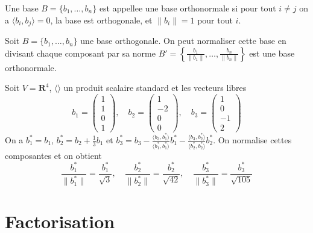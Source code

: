 \begin{definition}
Une base $B=\{ b_{1},\dots,b_{n} \}$ est appellee une base orthonormale si pour tout $i\neq j$ on a $\langle b_{i},b_{j} \rangle=0$, la base est orthogonale, et $\lVert b_{i} \rVert=1$ pour tout $i$.
\end{definition}
\begin{remark}
Soit $B=\{ b_{1},\dots,b_{n} \}$ une base orthogonale. On peut normaliser cette base en divisant chaque composant par sa norme $B'=\left\{  \frac{b_{1}}{\lVert b_{1} \rVert},\dots, \frac{b_{n}}{\lVert b_{n} \rVert}  \right\}$ est une base orthonormale.
\end{remark}
\begin{example}
Soit $V=\mathbf{R}^{4}$, $\langle  \rangle$ un produit scalaire standard et les vecteurs libres
$$
b_{1}=\begin{pmatrix}
1 \\
1 \\
0 \\
1
\end{pmatrix},\quad b_{2}=\begin{pmatrix}
1 \\
-2 \\
0 \\
0
\end{pmatrix}, \quad b_{3}=\begin{pmatrix}
1 \\
0 \\
-1 \\
2
\end{pmatrix}
$$
On a $b_{1}^{*}=b_{1}$, $b_{2}^{*}=b_{2}+\frac{1}{3}b_{1}$ et $b_{3}^{*}=b_{3}-\frac{\langle b_{3},b_{1}^{*} \rangle}{\langle b_{1}^{*},b_{1}^{*} \rangle}b_{1}^{*}-\frac{\langle b_{3},b_{2}^{*} \rangle}{\langle b_{2}^{*},b_{2}^{*} \rangle}b_{2}^{*}$. On normalise cettes composantes et on obtient
$$
\frac{b_{1}^{*}}{\lVert b_{1}^{*} \rVert }=\frac{b_{1}^{*}}{\sqrt{ 3 }},\quad \frac{b_{2}^{*}}{\lVert b_{2}^{*} \rVert }=\frac{b_{2}^{*}}{\sqrt{ 42 }},\quad \frac{b_{3}^{*}}{\lVert b_{3}^{*} \rVert }=\frac{b_{3}^{*}}{\sqrt{  105}}
$$
\end{example}

\section{Factorisation}

